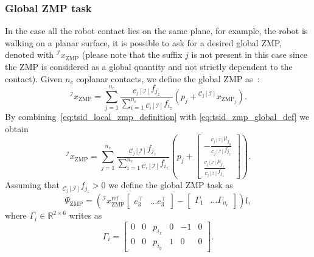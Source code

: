 \subsubsection{Global ZMP task}
In the case all the robot contact lies on the same plane, for example, the robot is walking on a planar surface, it is possible to ask for a desired global ZMP, denoted with ${}^\mathcal{I}x_\text{ZMP}$ (please note that the suffix $j$ is not present in this case since the ZMP is considered as a global quantity and not strictly dependent to the contact).
Given $n_c$ coplanar contacts, we define the global ZMP as~\citep[Section~3.2.3]{Kajita2014IntroductionRobotics}:
\begin{equation}
\label{eq:tsid_zmp_global_def}
    {}^\mathcal{I}x_\text{ZMP} = \sum_{j=1}^{n_c} \frac{{}_{\mathcal{C}_j[\mathcal{I}]}f_{j_z}}{\sum_{i=1}^{n_c} {}_{\mathcal{C}_i[\mathcal{I}]}f_{i_z}}\left( p_j + {}^{\mathcal{C}_j[\mathcal{I}]}x_{\text{ZMP}_j}  \right).
\end{equation}
By combining~\eqref{eq:tsid_local_zmp_definition} with \eqref{eq:tsid_zmp_global_def} we obtain
\begin{equation}
    {}^\mathcal{I}x_\text{ZMP} = \sum_{j=1}^{n_c} \frac{{}_{\mathcal{C}_j[\mathcal{I}]}f_{j_z}}{\sum_{i=1}^{n_c} {}_{\mathcal{C}_i[\mathcal{I}]}f_{i_z}}\left( p_j + 
    \begin{bmatrix}
   -\frac{{}_{\mathcal{C}_j[\mathcal{I}]} \mu_{j_y}}{{}_{\mathcal{C}_j[\mathcal{I}]} f_{j_z}} \\
   \frac{{}_{\mathcal{C}_j[\mathcal{I}]} \mu_{j_x}}{{}_{\mathcal{C}_j[\mathcal{I}]} f_{j_z}}
   \end{bmatrix}  \right).
\end{equation}
Assuming that ${}_{\mathcal{C}_j[\mathcal{I}]}f_{j_z} > 0$ we define the global ZMP task as 
\begin{equation}
\label{eq:tsid_zmp_global_task}
    \Psi_{\text{ZMP}} = \left({}^{\mathcal{I}} x_{\text{ZMP}}^\text{ref}   \begin{bmatrix}
        e_3^\top & \hdots e_3^\top 
    \end{bmatrix}- 
    \begin{bmatrix}
        \Gamma_1 & \hdots \Gamma_{n_c}
    \end{bmatrix} \right)\mathrm{f},
\end{equation}
where $\Gamma_i\in \mathbb{R}^{2\times6}$ writes as
\begin{equation}
 \Gamma_i = \begin{bmatrix}
 0 & 0 & p_{i_x} & 0 & -1 & 0 \\
 0 & 0 & p_{i_y} & 1 & 0 & 0
 \end{bmatrix}.
\end{equation}


